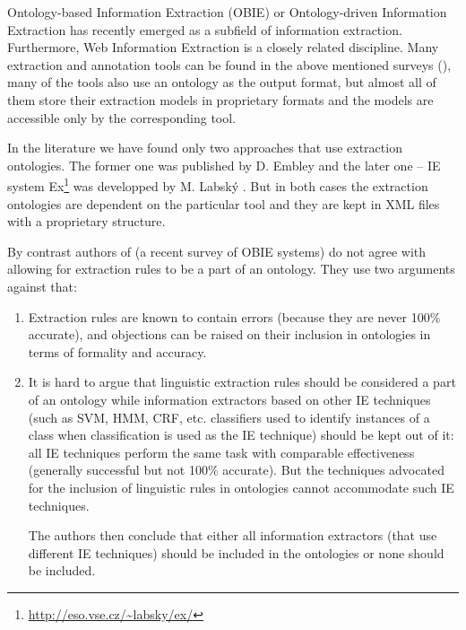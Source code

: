 Ontology-based Information Extraction (OBIE) \citep{citeulike:7291004} or Ontology-driven Information Extraction \citep{Yildiz:2007:OMO:1793154.1793216} has recently emerged as a subfield of information extraction. Furthermore, Web Information Extraction \citep{biblio:Survey_of_Web_Information_Extraction_Systems} is a closely related discipline. Many extraction and annotation tools can be found in the above mentioned surveys (\citep{biblio:Survey_of_Web_Information_Extraction_Systems}), many of the tools also use an ontology as the output format, but almost all of them store their extraction models in proprietary formats and the models are accessible only by the corresponding tool.

In the literature we have found only two approaches that use extraction ontologies. The former one was published by D. Embley \citep{DBLP:conf/er/EmbleyTL02,Embley:2004:TSU:1012294.1012295}
and the later one -- IE system Ex\footnote{\url{http://eso.vse.cz/~labsky/ex/}} was developped by M. Labsk\'{y} \citep{springerlink:10.1007/978-3-642-01891-6_5}. 
But in both cases the extraction ontologies are dependent on the particular tool and they are kept in XML files with a proprietary structure.


By contrast authors of \citep{citeulike:7291004} (a recent survey of OBIE systems) do not agree with allowing for extraction rules to be a part of an ontology. They use two arguments against that:
\begin{enumerate}
	\item Extraction rules are known to contain errors (because they are never 100\% accurate), and objections can be raised on their inclusion in ontologies in terms of formality and accuracy.

	\item It is hard to argue that linguistic extraction rules should be considered a part of an ontology while information extractors based on other IE techniques (such as SVM, HMM, CRF, etc. classifiers used to identify instances of a class when classification is used as the IE technique) should be kept out of it: all IE techniques perform the same task with comparable effectiveness (generally successful but not 100\% accurate). But the techniques advocated for the inclusion of linguistic rules in ontologies cannot accommodate such IE techniques.
	
The authors then conclude that either all information extractors (that use different IE techniques) should be included in the ontologies or none should be included.
\end{enumerate}



